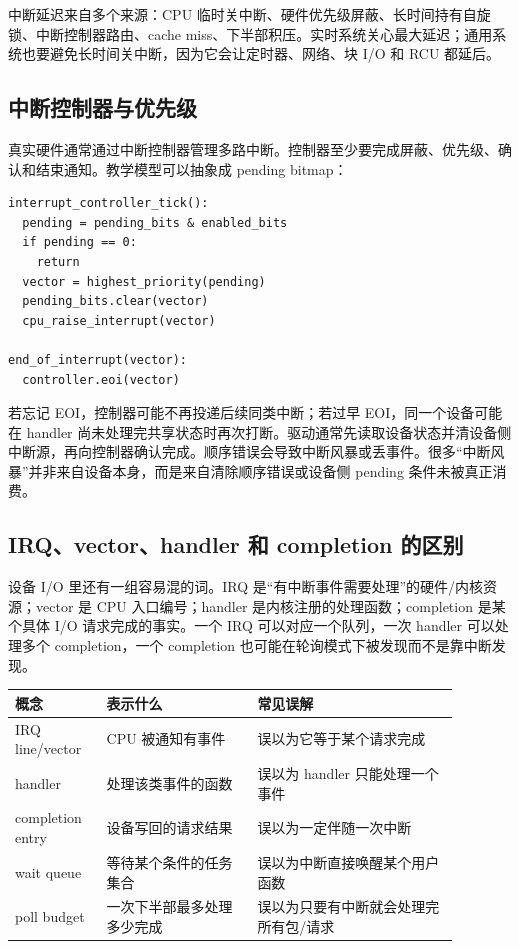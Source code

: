 中断延迟来自多个来源：CPU 临时关中断、硬件优先级屏蔽、长时间持有自旋锁、中断控制器路由、cache miss、下半部积压。实时系统关心最大延迟；通用系统也要避免长时间关中断，因为它会让定时器、网络、块 I/O 和 RCU 都延后。

\subsection{中断控制器与优先级}

真实硬件通常通过中断控制器管理多路中断。控制器至少要完成屏蔽、优先级、确认和结束通知。教学模型可以抽象成 pending bitmap：

\begin{lstlisting}
interrupt_controller_tick():
  pending = pending_bits & enabled_bits
  if pending == 0:
    return
  vector = highest_priority(pending)
  pending_bits.clear(vector)
  cpu_raise_interrupt(vector)

end_of_interrupt(vector):
  controller.eoi(vector)
\end{lstlisting}

\begin{warningbox}
若忘记 EOI，控制器可能不再投递后续同类中断；若过早 EOI，同一个设备可能在 handler 尚未处理完共享状态时再次打断。驱动通常先读取设备状态并清设备侧中断源，再向控制器确认完成。顺序错误会导致中断风暴或丢事件。很多“中断风暴”并非来自设备本身，而是来自清除顺序错误或设备侧 pending 条件未被真正消费。
\end{warningbox}

\subsection{IRQ、vector、handler 和 completion 的区别}

设备 I/O 里还有一组容易混的词。IRQ 是“有中断事件需要处理”的硬件/内核资源；vector 是 CPU 入口编号；handler 是内核注册的处理函数；completion 是某个具体 I/O 请求完成的事实。一个 IRQ 可以对应一个队列，一次 handler 可以处理多个 completion，一个 completion 也可能在轮询模式下被发现而不是靠中断发现。

\begin{longtable}{p{0.18\linewidth}p{0.30\linewidth}p{0.40\linewidth}}
\toprule
概念 & 表示什么 & 常见误解 \\
\midrule
IRQ line/vector & CPU 被通知有事件 & 误以为它等于某个请求完成 \\
handler & 处理该类事件的函数 & 误以为 handler 只能处理一个事件 \\
completion entry & 设备写回的请求结果 & 误以为一定伴随一次中断 \\
wait queue & 等待某个条件的任务集合 & 误以为中断直接唤醒某个用户函数 \\
poll budget & 一次下半部最多处理多少完成 & 误以为只要有中断就会处理完所有包/请求 \\
\bottomrule
\end{longtable}


